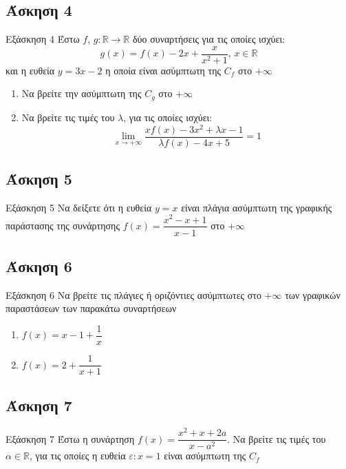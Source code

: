\documentclass[greek]{beamer}
\begin{document}
\subsection{Άσκηση 4}
\begin{frame}[label=Άσκηση4,t]{Εξάσκηση 4}
 Έστω $f$, $g:\mathbb{R}\to\mathbb{R}$ δύο συναρτήσεις για τις οποίες ισχύει:
 $$g(x)=f(x)-2x+\dfrac{x}{x^2+1} \text{, } x\in\mathbb{R}$$
 και η ευθεία $y=3x-2$ η οποία είναι ασύμπτωτη της $C_f$ στο $+\infty$
 \begin{enumerate}
  \item<1-> Να βρείτε την ασύμπτωτη της $C_g$ στο $+\infty$
  \item<2-> Να βρείτε τις τιμές του $λ$, για τις οποίες ισχύει:
  $$\lim\limits_{x \to +\infty}{ \dfrac{xf(x)-3x^2+λx-1}{λf(x)-4x+5} }=1$$
 \end{enumerate}

\end{frame}

\subsection{Άσκηση 5}
\begin{frame}[label=Άσκηση5,t]{Εξάσκηση 5}
 Να δείξετε ότι η ευθεία $y=x$ είναι πλάγια ασύμπτωτη της γραφικής παράστασης της συνάρτησης $f(x)=\dfrac{x^2-x+1}{x-1}$ στο $+\infty$

\end{frame}

\subsection{Άσκηση 6}
\begin{frame}[label=Άσκηση6,t]{Εξάσκηση 6}
 Να βρείτε τις πλάγιες ή οριζόντιες ασύμπτωτες στο $+\infty$ των γραφικών παραστάσεων των παρακάτω συναρτήσεων
 \begin{enumerate}
  \item<1-> $f(x)=x-1+\dfrac{1}{x}$
  \item<2-> $f(x)=2+\dfrac{1}{x+1}$
 \end{enumerate}

\end{frame}

\subsection{Άσκηση 7}
\begin{frame}[label=Άσκηση7,t]{Εξάσκηση 7}
 Έστω η συνάρτηση $f(x)=\dfrac{x^2+x+2a}{x-a^2}$. Να βρείτε τις τιμές του $α\in\mathbb{R}$, για τις οποίες η ευθεία $ε:x=1$ είναι ασύμπτωτη της $C_f$

\end{frame}
\end{document}
